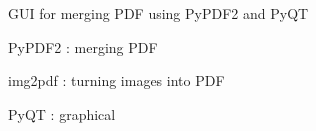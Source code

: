 G\+UI for merging P\+DF using Py\+P\+D\+F2 and Py\+QT


\begin{DoxyItemize}
\item Py\+P\+D\+F2 \+: merging P\+DF
\item img2pdf \+: turning images into P\+DF
\item Py\+QT \+: graphical 
\end{DoxyItemize}
